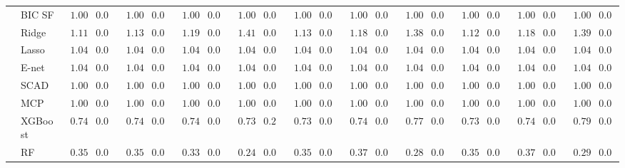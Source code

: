 \begin{tabular}{p{0.2cm}p{1cm}|p{0.6cm}p{0.6cm}|p{0.6cm}p{0.6cm}p{0.6cm}p{0.6cm}p{0.6cm}p{0.6cm}|p{0.6cm}p{0.6cm}p{0.6cm}p{0.6cm}p{0.6cm}p{0.6cm}|p{0.6cm}p{0.6cm}p{0.6cm}p{0.6cm}p{0.6cm}p{0.6cm}}
 & BIC SF  & $\phantom{0}1.00$ & $0.04$ & $\phantom{0}1.00$ & $0.04$ & $\phantom{0}1.00$ & $0.04$ & $\phantom{0}1.00$ & $0.04$ & $\phantom{0}1.00$ & $0.04$ & $\phantom{0}1.00$ & $0.04$ & $\phantom{0}1.00$ & $0.04$ & $\phantom{0}1.00$ & $0.04$ & $\phantom{0}1.00$ & $0.04$ & $\phantom{0}1.00$ & $0.04$ \\
 & Ridge  & $\phantom{0}1.11$ & $0.05$ & $\phantom{0}1.13$ & $0.05$ & $\phantom{0}1.19$ & $0.05$ & $\phantom{0}1.41$ & $0.05$ & $\phantom{0}1.13$ & $0.05$ & $\phantom{0}1.18$ & $0.05$ & $\phantom{0}1.38$ & $0.05$ & $\phantom{0}1.12$ & $0.05$ & $\phantom{0}1.18$ & $0.05$ & $\phantom{0}1.39$ & $0.05$ \\
 & Lasso  & $\phantom{0}1.04$ & $0.05$ & $\phantom{0}1.04$ & $0.05$ & $\phantom{0}1.04$ & $0.05$ & $\phantom{0}1.04$ & $0.05$ & $\phantom{0}1.04$ & $0.05$ & $\phantom{0}1.04$ & $0.05$ & $\phantom{0}1.04$ & $0.05$ & $\phantom{0}1.04$ & $0.05$ & $\phantom{0}1.04$ & $0.05$ & $\phantom{0}1.04$ & $0.05$ \\
 & E-net  & $\phantom{0}1.04$ & $0.05$ & $\phantom{0}1.04$ & $0.05$ & $\phantom{0}1.04$ & $0.05$ & $\phantom{0}1.04$ & $0.05$ & $\phantom{0}1.04$ & $0.05$ & $\phantom{0}1.04$ & $0.05$ & $\phantom{0}1.04$ & $0.05$ & $\phantom{0}1.04$ & $0.05$ & $\phantom{0}1.04$ & $0.05$ & $\phantom{0}1.04$ & $0.05$ \\
 & SCAD  & $\phantom{0}1.00$ & $0.04$ & $\phantom{0}1.00$ & $0.04$ & $\phantom{0}1.00$ & $0.04$ & $\phantom{0}1.00$ & $0.04$ & $\phantom{0}1.00$ & $0.04$ & $\phantom{0}1.00$ & $0.04$ & $\phantom{0}1.00$ & $0.04$ & $\phantom{0}1.00$ & $0.04$ & $\phantom{0}1.00$ & $0.04$ & $\phantom{0}1.00$ & $0.04$ \\
 & MCP  & $\phantom{0}1.00$ & $0.04$ & $\phantom{0}1.00$ & $0.04$ & $\phantom{0}1.00$ & $0.04$ & $\phantom{0}1.00$ & $0.04$ & $\phantom{0}1.00$ & $0.04$ & $\phantom{0}1.00$ & $0.04$ & $\phantom{0}1.00$ & $0.04$ & $\phantom{0}1.00$ & $0.04$ & $\phantom{0}1.00$ & $0.04$ & $\phantom{0}1.00$ & $0.04$ \\
 & XGBoost  & $\phantom{0}0.74$ & $0.04$ & $\phantom{0}0.74$ & $0.03$ & $\phantom{0}0.74$ & $0.04$ & $\phantom{0}0.73$ & $0.21$ & $\phantom{0}0.73$ & $0.04$ & $\phantom{0}0.74$ & $0.03$ & $\phantom{0}0.77$ & $0.08$ & $\phantom{0}0.73$ & $0.04$ & $\phantom{0}0.74$ & $0.03$ & $\phantom{0}0.79$ & $0.03$ \\
 & RF  & $\phantom{0}0.35$ & $0.01$ & $\phantom{0}0.35$ & $0.01$ & $\phantom{0}0.33$ & $0.01$ & $\phantom{0}0.24$ & $0.01$ & $\phantom{0}0.35$ & $0.01$ & $\phantom{0}0.37$ & $0.01$ & $\phantom{0}0.28$ & $0.01$ & $\phantom{0}0.35$ & $0.01$ & $\phantom{0}0.37$ & $0.02$ & $\phantom{0}0.29$ & $0.01$ \\

\end{tabular}
